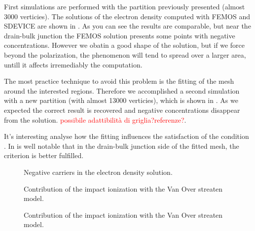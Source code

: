 First simulations are performed with the partition previously presented (almost 3000 verticies). The solutions of the electron density computed with FEMOS and SDEVICE are shown in . As you can see the results are comparable, but near the drain-bulk junction the FEMOS solution presents some points with negative concentrations. However we obatin a good shape of the solution, but if we force beyond the polarization, the phenomenon will tend to spread over a larger area, untill it affects irremediably the computation.

The most practice technique to avoid this problem is the fitting of the mesh around the interested regions. Therefore we accomplished a second simulation with a new partition (with almost 13000 verticies), which is shown in . As we expected the correct result is recovered and negative concentrations disappear from the solution. \textcolor{red}{possibile adattibilità di griglia?referenze?}.

It's interesting analyse how the fitting influences the satisfaction of the condition . In  is well notable that in the drain-bulk junction side of the fitted mesh, the criterion is better fulfilled.


\begin{figure}[!h]
\centering
{}
\hspace{1cm}
\caption{Negative carriers in the electron density solution.}
\label{fig: negative carriers MOS}
\end{figure}

\begin{figure}[!h]
\centering
{}
\hspace{1cm}
\caption{Contribution of the impact ionization with the Van Over streaten model.}
\label{fig: drain stress mos 13000}
\end{figure}

\begin{figure}[!h]
\centering
{}
\hspace{1cm}
\caption{Contribution of the impact ionization with the Van Over streaten model.}
\label{fig: zikatanov mos}
\end{figure}


